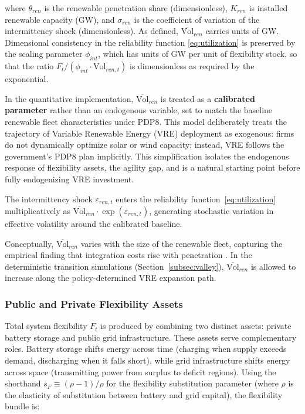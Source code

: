 \documentclass[12pt, a4paper]{article}
\begin{document}
	where $\theta_{ren}$ is the renewable penetration share (dimensionless), $K_{ren}$ is installed renewable capacity (GW), and $\sigma_{ren}$ is the coefficient of variation of the intermittency shock (dimensionless). As defined, $\overline{\text{Vol}}_{ren}$ carries units of GW. Dimensional consistency in the reliability function \eqref{eq:utilization} is preserved by the scaling parameter $\phi_{int}$, which has units of GW per unit of flexibility stock, so that the ratio $F_t / (\phi_{int} \cdot \text{Vol}_{ren,t})$ is dimensionless as required by the exponential.
	
	In the quantitative implementation, $\overline{\text{Vol}}_{ren}$ is treated as a \textbf{calibrated parameter} rather than an endogenous variable, set to match the baseline renewable fleet characteristics under PDP8. This model deliberately treats the trajectory of Variable Renewable Energy (VRE) deployment as exogenous: firms do not dynamically optimize solar or wind capacity; instead, VRE follows the government's PDP8 plan implicitly. This simplification isolates the endogenous response of flexibility assets, the agility gap, and is a natural starting point before fully endogenizing VRE investment.
	
	The intermittency shock $\varepsilon_{ren,t}$ enters the reliability function~\eqref{eq:utilization} multiplicatively as $\overline{\text{Vol}}_{ren} \cdot \exp(\varepsilon_{ren,t})$, generating stochastic variation in effective volatility around the calibrated baseline.
	
	Conceptually, $\overline{\text{Vol}}_{ren}$ varies with the size of the renewable fleet, capturing the empirical finding that integration costs rise with penetration \citep{hirth2013}. In the deterministic transition simulations (Section~\ref{subsec:valley}), $\overline{\text{Vol}}_{ren}$ is allowed to increase along the policy-determined VRE expansion path.
	
	\subsubsection{Public and Private Flexibility Assets}
	
	Total system flexibility $F_t$ is produced by combining two distinct assets: private battery storage and public grid infrastructure. These assets serve complementary roles. Battery storage shifts energy across time (charging when supply exceeds demand, discharging when it falls short), while grid infrastructure shifts energy across space (transmitting power from surplus to deficit regions). Using the shorthand $s_F \equiv (\rho - 1)/\rho$ for the flexibility substitution parameter (where $\rho$ is the elasticity of substitution between battery and grid capital), the flexibility bundle is:
	
\end{document}
